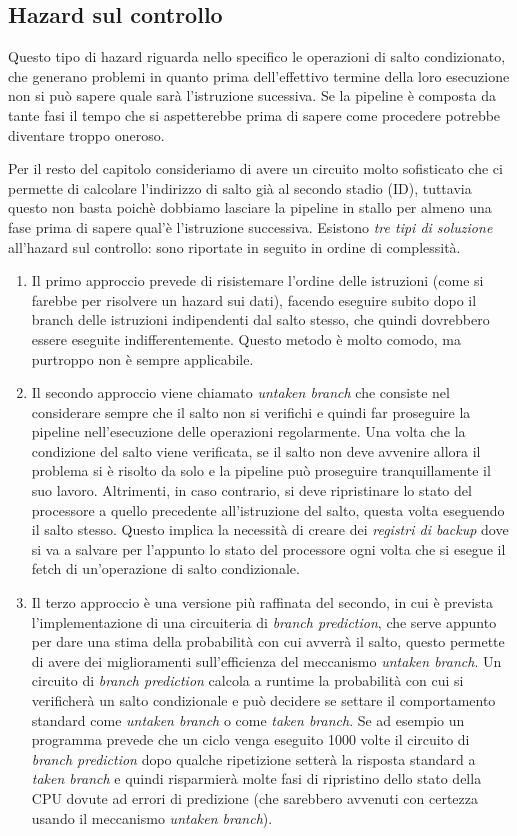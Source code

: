 \documentclass[class=book, crop=false, oneside]{standalone}
\begin{document}
\subsection{Hazard sul controllo}
Questo tipo di hazard riguarda nello specifico le operazioni di salto condizionato, che generano problemi in quanto prima dell'effettivo termine della loro esecuzione non si può sapere quale sarà l'istruzione sucessiva. Se la pipeline è composta da tante fasi il tempo che si aspetterebbe prima di sapere come procedere potrebbe diventare troppo oneroso.

Per il resto del capitolo consideriamo di avere un circuito molto sofisticato che ci permette di calcolare l’indirizzo di salto già al secondo stadio (ID), tuttavia questo non basta poichè dobbiamo lasciare la pipeline in stallo per almeno una fase prima di sapere qual'è l'istruzione successiva. Esistono \emph{tre tipi di soluzione} all'hazard sul controllo: sono riportate in seguito in ordine di complessità.

\begin{enumerate}
	\item Il primo approccio prevede di risistemare l'ordine delle istruzioni (come si farebbe per risolvere un hazard sui dati), facendo eseguire subito dopo il branch delle istruzioni indipendenti dal salto stesso, che quindi dovrebbero essere eseguite indifferentemente. Questo metodo è molto comodo, ma purtroppo non è sempre applicabile.
	\item Il secondo approccio viene chiamato \emph{untaken branch} che consiste nel considerare sempre che il salto non si verifichi e quindi far proseguire la pipeline nell'esecuzione delle operazioni regolarmente. Una volta che la condizione del salto viene verificata, se il salto non deve avvenire allora il problema si è risolto da solo e la pipeline può proseguire tranquillamente il suo lavoro. Altrimenti, in caso contrario, si deve ripristinare lo stato del processore a quello precedente all'istruzione del salto, questa volta eseguendo il salto stesso. Questo implica la necessità di creare dei \emph{registri di backup} dove si va a salvare per l'appunto lo stato del processore ogni volta che si esegue il fetch di un'operazione di salto condizionale.
	\item Il terzo approccio è una versione più raffinata del secondo, in cui è prevista l'implementazione di una circuiteria di \emph{branch prediction}, che serve appunto per dare una stima della probabilità con cui avverrà il salto, questo permette di avere dei miglioramenti sull'efficienza del meccanismo \emph{untaken branch}. Un circuito di \emph{branch prediction} calcola a runtime la probabilità con cui si verificherà un salto condizionale e può decidere se settare il comportamento standard come \emph{untaken branch} o come \emph{taken branch}. Se ad esempio un programma prevede che un ciclo venga eseguito 1000 volte il circuito di \emph{branch prediction} dopo qualche ripetizione setterà la risposta standard a \emph{taken branch} e quindi risparmierà molte fasi di ripristino dello stato della CPU dovute ad errori di predizione (che sarebbero avvenuti con certezza usando il meccanismo \emph{untaken branch}).
\end{enumerate}
\end{document}
